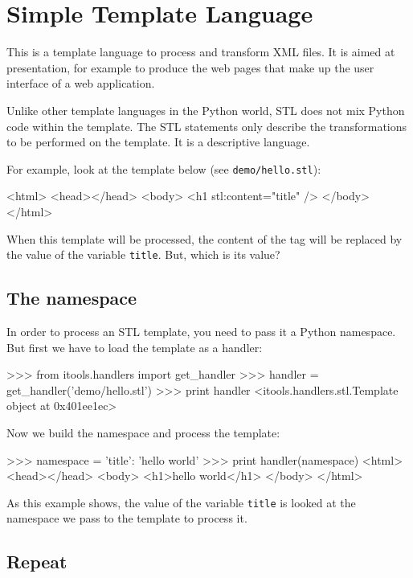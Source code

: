 \chapter{Simple Template Language}

This is a template language to process and transform XML files. It is
aimed at presentation, for example to produce the web pages that make
up the user interface of a web application.

Unlike other template languages in the Python world, STL does not mix
Python code within the template. The STL statements only describe the
transformations to be performed on the template. It is a descriptive
language.

For example, look at the template below (see {\tt demo/hello.stl}):

\begin{code}
    <html>
      <head></head>
      <body>
        <h1 stl:content="title" />
      </body>
    </html>
\end{code}

When this template will be processed, the content of the {\tt <h1>} tag
will be replaced by the value of the variable {\tt title}. But, which
is its value?

\section{The namespace}

In order to process an STL template, you need to pass it a Python
namespace. But first we have to load the template as a handler:

\begin{code}
    >>> from itools.handlers import get_handler
    >>> handler = get_handler('demo/hello.stl')
    >>> print handler
    <itools.handlers.stl.Template object at 0x401ee1ec>
\end{code}

Now we build the namespace and process the template:

\begin{code}
    >>> namespace = {'title': 'hello world'}
    >>> print handler(namespace)
    <html>
      <head></head>
      <body>
        <h1>hello world</h1>
      </body>
    </html>
\end{code}


As this example shows, the value of the variable {\tt title} is looked at
the namespace we pass to the template to process it.


\section{Repeat}

